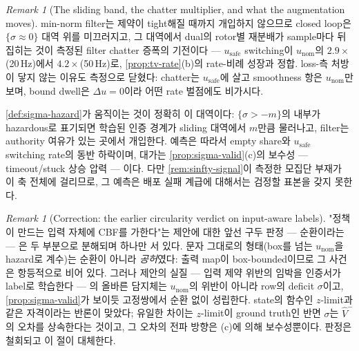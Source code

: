 \documentclass[11pt]{article}
\theoremstyle{plain}
\theoremstyle{definition}
\theoremstyle{remark}
\newtheorem{remark}[theorem]{Remark}
\newcommand{\Vhat}{\widehat V}
\begin{document}
\begin{remark}[The sliding band, the chatter multiplier, and what the augmentation moves]\label{rem:sigma-chatter}
min-norm filter는 제약이 tight해질 때까지 개입하지 않으므로 closed loop은
$\{\sigma\approx0\}$ 대역 위를 미끄러지고, 그 대역에서 dual의 rotor별 재분배가 sample마다
뒤집히는 것이 측정된 filter chatter 증폭의 기전이다 --- $u_{\mathrm{safe}}$ switching이
$u_{\mathrm{nom}}$의 $2.9\times$(20\,Hz)에서 $4.2\times$(50\,Hz)로, \cref{prop:tv-rate}(b)의
rate-비례 성장과 정합. loss-측 처방이 닿지 않는 이유도 측정으로 닫혔다: chatter는
$u_{\mathrm{safe}}$에 살고 smoothness 항은 $u_{\mathrm{nom}}$만 보며, bound dwell은
$\Delta u=0$이라 어떤 rate 벌점에도 비가시다.

\cref{def:sigma-hazard}가 움직이는 것이 정확히 이 대역이다: $\{\sigma>-m\}$의 내부가
hazardous로 표기되면 학습된 인증 경계가 sliding 대역에서 $m$만큼 물러나고, filter는
authority 여유가 있는 곳에서 개입한다. 예측은 따라서 empty share와
$u_{\mathrm{safe}}$ switching rate의 동반 하락이며, 대가는
\cref{prop:sigma-valid}(c)의 보수성 --- timeout/stuck 상승 압력 --- 이다. 다만
\cref{rem:sinfty-signal}이 측정한 모집단 부재가 이 축 전체에 걸리므로, 그 예측은 배포 실패
계급에 대해서는 검정할 표본을 갖지 못한다.
\end{remark}

\begin{remark}[Correction: the earlier circularity verdict on input-aware labels]\label{rem:sigma-retract}
"정책이 만드는 입력 자체에 CBF를 가한다"는 제안에 대한 앞선 구두 판정 --- 순환이라는 ---
은 두 부분으로 분해되며 하나만 서 있다. 문자 그대로의 형태(box를 넘는 $u_{\mathrm{nom}}$을
hazard로 계수)는 순환이 아니라 \emph{공허}였다: 출력 map이 box-bounded이므로 그 사건은
항등적으로 비어 있다. 그러나 제안의 실질 --- 입력 제약 위반의 임박을 인증서가 label로
학습한다 --- 의 올바른 담지체는 $u_{\mathrm{nom}}$의 위반이 아니라 row의 deficit
$\sigma$이고, \cref{prop:sigma-valid}가 보이듯 고정쌍에서 순환 없이 성립한다. state의
함수인 $z$-limit과 같은 자격이라는 반론이 맞았다; 유일한 차이는 $z$-limit이 ground truth인
반면 $\sigma$는 $\Vhat^-$의 오차를 상속한다는 것이고, 그 오차의 전파 방향은 (c)에 의해
보수성뿐이다. 판정은 철회되고 이 절이 대체한다.
\end{remark}
\end{document}
